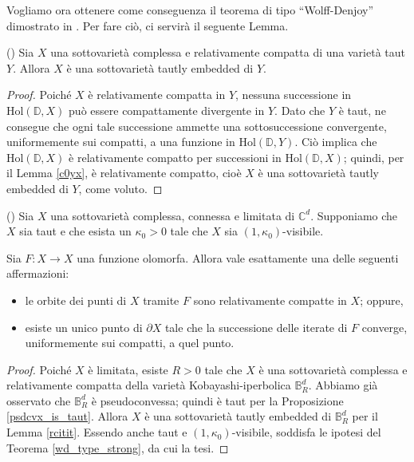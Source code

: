 Vogliamo ora ottenere come conseguenza il teorema di tipo ``Wolff-Denjoy'' dimostrato in \cite{CMS}. Per fare ciò, ci servirà il seguente Lemma.

\begin{lm} \label{rcitit}
    (\cite[Proposition 2.1.5]{A1}) Sia $X$ una sottovarietà complessa e relativamente compatta di una varietà taut $Y$. Allora $X$ è una sottovarietà tautly embedded di $Y$.
\end{lm}

\begin{proof}
    Poiché $X$ è relativamente compatta in $Y$, nessuna successione in $\text{Hol}(\mathbb{D},X)$ può essere compattamente divergente in $Y$. Dato che $Y$ è taut, ne consegue che ogni tale successione ammette una sottosuccessione convergente, uniformemente sui compatti, a una funzione in $\text{Hol}(\mathbb{D},Y)$. Ciò implica che $\text{Hol}(\mathbb{D},X)$ è relativamente compatto per successioni in $\text{Hol}(\mathbb{D},X)$; quindi, per il Lemma \ref{c0yx}, è relativamente compatto, cioè $X$ è una sottovarietà tautly embedded di $Y$, come voluto.
\end{proof}

\begin{cor} \label{wd_type}
    (\cite[Theorem 1.15]{CMS}) Sia $X$ una sottovarietà complessa, connessa e limitata di $\mathbb{C}^d$. Supponiamo che $X$ sia taut e che esista un $\kappa_0>0$ tale che $X$ sia $(1,\kappa_0)$-visibile.
    
    Sia $F:X \longrightarrow X$ una funzione olomorfa. Allora vale esattamente una delle seguenti affermazioni:
    \begin{itemize}
        \item le orbite dei punti di $X$ tramite $F$ sono relativamente compatte in $X$; oppure,
        \item esiste un unico punto di $\partial X$ tale che la successione delle iterate di $F$ converge, uniformemente sui compatti, a quel punto.
    \end{itemize}
\end{cor}

\begin{proof}
    Poiché $X$ è limitata, esiste $R>0$ tale che $X$ è una sottovarietà complessa e relativamente compatta della varietà Kobayashi-iperbolica $\mathbb{B}_R^d$. Abbiamo già osservato che $\mathbb{B}_R^d$ è pseudoconvessa; quindi è taut per la Proposizione \ref{psdcvx_is_taut}. Allora $X$ è una sottovarietà tautly embedded di $\mathbb{B}_R^d$ per il Lemma \ref{rcitit}. Essendo anche taut e $(1,\kappa_0)$-visibile, soddisfa le ipotesi del Teorema \ref{wd_type_strong}, da cui la tesi.
\end{proof}

